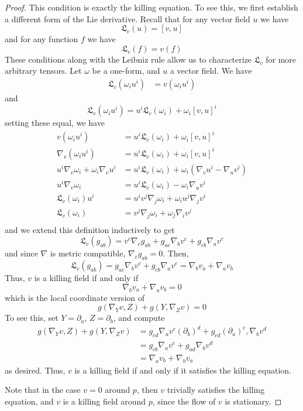 \documentclass[fontsize=11pt]{scrartcl} %
\numberwithin{equation}{section} %
\numberwithin{figure}{section} %
\numberwithin{table}{section} %
\begin{document}
\begin{proof}
    This condition is exactly the killing equation. To see this, we first
    establish a different form of the Lie derivative. Recall that for any vector
    field $u$ we have
    \[
        \mathfrak{L}_v(u) = [v,u]
    \]
    and for any function $f$ we have
    \[
        \mathfrak{L}_v(f) = v(f)
    \]
    These conditions along with the Leibniz rule allow us to characterize
    $\mathfrak{L}_v$ for more arbitrary tensors. Let $\omega$ be a one-form, and
    $u$ a vector field. We have
    \[
\begin{aligned}
    \mathfrak{L}_v(\omega_iu^i) &= v(\omega_iu^i)
\end{aligned}
    \]
    and
    \[
        \mathfrak{L}_v(\omega_iu^i) = u^i\mathfrak{L}_v(\omega_i) +
        \omega_i[v,u]^i
    \]
    setting these equal, we have
    \[
        \begin{aligned}
            v(\omega_iu^i) &= u^i\mathfrak{L}_v(\omega_i) + \omega_i[v,u]^i\\
            \nabla_v(\omega_iu^i) &= u^i\mathfrak{L}_v(\omega_i) +
            \omega_i[v,u]^i\\
            u^i\nabla_v\omega_i + \omega_i\nabla_vu^i
            &= u^i\mathfrak{L}_v(\omega_i) + \omega_i(\nabla_vu^i -
            \nabla_uv^i)\\
            u^i\nabla_v\omega_i &= u^i\mathfrak{L}_v(\omega_i) -
            \omega_i\nabla_uv^i\\
            \mathfrak{L}_v(\omega_i)u^i &= u^iv^j\nabla_j\omega_i +
            \omega_iu^j\nabla_jv^i\\
            \mathfrak{L}_v(\omega_i) &= v^j\nabla_j\omega_i +
            \omega_j\nabla_iv^j\\
        \end{aligned}
    \]
    and we extend this definition inductively to get
    \[
        \mathfrak{L}_v(g_{ab}) = v^c\nabla_cg_{ab} + g_{ac}\nabla_b v^c +
        g_{cb}\nabla_a v^c
    \]
    and since $\nabla$ is metric compatible, $\nabla_cg_{ab} = 0$. Then,
    \[
        \mathfrak{L}_v(g_{ab}) = g_{ac}\nabla_bv^c+g_{cb}\nabla_av^c
        = \nabla_bv_a + \nabla_av_b
    \]
    Thus, $v$ is a killing field if and only if
    \[
        \nabla_bv_a + \nabla_av_b = 0
    \]
    which is the local coordinate version of
    \[
        g(\nabla_Yv,Z) + g(Y,\nabla_Zv) = 0
    \]
    To see this, set $Y=\partial_a$, $Z=\partial_b$, and compute
    \[
        \begin{aligned}
        g(\nabla_Yv,Z) + g(Y,\nabla_Zv)
        &= g_{cd}\nabla_av^c(\partial_b)^d + g_{cd}(\partial_a)^c,\nabla_bv^d\\
        &=g_{cb}\nabla_av^c + g_{ad}\nabla_bv^d\\
        &=\nabla_av_b + \nabla_bv_a
    \end{aligned}
    \]
    as desired. Thus, $v$ is a killing field if and only if it satisfies the
    killing equation.

    Note that in the case $v=0$ around $p$, then $v$ trivially satisfies the
    killing equation, and $v$ is a killing field around $p$, since  the flow of
    $v$ is stationary.
\end{proof}
\end{document}
